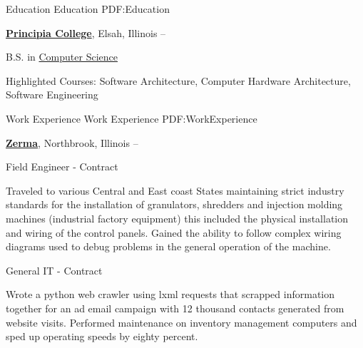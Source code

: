 \documentclass[a4paper,MMMyyyy,nonstopmode]{simpleresumecv}
\newcommand{\CVAuthor}{Bjørn Mathisen}
\newcommand{\CVWebpage}{https://bjornmathisen.com}
\begin{document}

\Title{\CVAuthor}

\begin{SubTitle}
\href{https://goo.gl/maps/gpk9cV4DUPH9WCLn6} %
{1511 Laurel, St Paul, Minnesota, 55104}
\par
\href{mailto:contact@bjornmathisen.com}
{contact@bjornmathisen.com}
\,\SubBulletSymbol\,
+1\,(224)\,622-8543
\,\SubBulletSymbol\,
\href{\CVWebpage}
{\url{Bjørn Mathisen}
\end{SubTitle}

\begin{Body}


\Section
{Education}
{Education}
{PDF:Education}

\Entry
\href{http://www.principiacollege.edu/}
{\textbf{Principia College}},
Elsah, Illinois
\hfill
{} --

\Gap
\BulletItem
B.S. in
\href{http://www.principiacollege.edu/computer-science}
{Computer Science}
\begin{Detail}
\SubBulletItem
Highlighted Courses: Software Architecture, Computer Hardware Architecture, Software Engineering 
\end{Detail}


\Section
{Work\newline
Experience}
{Work Experience}
{PDF:WorkExperience}

\Entry
\href{https://zerma.com/en}
{\textbf{Zerma}},
Northbrook, Illinois
\hfill {} --

\Gap
\BulletItem
Field Engineer - Contract

\begin{Detail}
\SubBulletItem
Traveled to various Central and East coast States maintaining strict industry standards for the installation of granulators, shredders and injection molding machines (industrial factory equipment) this included the physical installation and wiring of the control panels. Gained the ability to follow complex wiring diagrams used to debug problems in the general operation of the machine. 
\end{Detail}
\BulletItem
General IT - Contract
\begin{Detail}
\SubBulletItem
Wrote a python web crawler using lxml requests that scrapped information together for an ad email campaign with 12 thousand contacts generated from website visits. Performed maintenance on inventory management computers and sped up operating speeds by eighty percent.
\end{Detail}


\end{Body}
\end{document}

